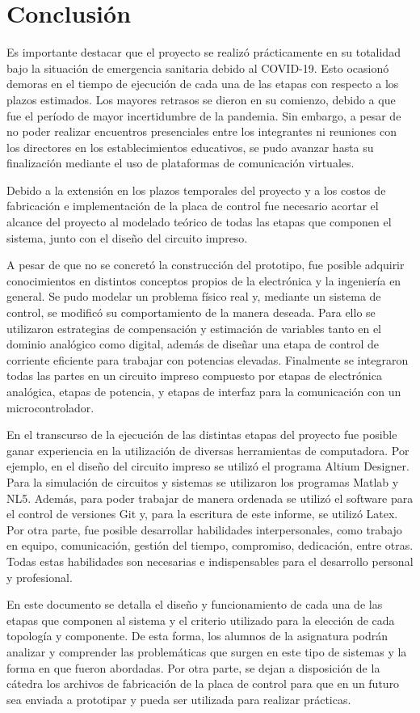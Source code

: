 \chapter{Conclusión}  \label{cap:Conclusión}
Es importante destacar que el proyecto se realizó prácticamente en su totalidad bajo la situación de emergencia sanitaria debido al COVID-19. Esto ocasionó demoras en el tiempo de ejecución de cada una de las etapas con respecto a los plazos estimados. Los mayores retrasos se dieron en su comienzo, debido a que fue el período de mayor incertidumbre de la pandemia. Sin embargo, a pesar de no poder realizar encuentros presenciales entre los integrantes ni reuniones con los directores en los establecimientos educativos, se pudo avanzar hasta su finalización  mediante el uso de plataformas de comunicación virtuales.

Debido a la extensión en los plazos temporales del proyecto y a los costos de fabricación e implementación de la placa de control fue necesario acortar el alcance del proyecto al modelado teórico de todas las etapas que componen el sistema, junto con el diseño del circuito impreso.

A pesar de que no se concretó la construcción del prototipo, fue posible adquirir conocimientos en distintos conceptos propios de la electrónica y la ingeniería en general. Se pudo modelar un problema físico real y, mediante un sistema de control, se modificó su comportamiento de la manera deseada. Para ello se utilizaron estrategias de compensación y estimación de variables tanto en el dominio analógico como digital, además de diseñar una etapa de control de corriente eficiente para trabajar con potencias elevadas. Finalmente se integraron todas las partes en un circuito impreso compuesto por etapas de electrónica analógica, etapas de potencia, y etapas de interfaz para la comunicación con un microcontrolador.

En el transcurso de la ejecución de las distintas etapas del proyecto fue posible ganar experiencia en la utilización de diversas herramientas de computadora. Por ejemplo, en el diseño del circuito impreso se utilizó el programa Altium Designer. Para la simulación de circuitos y sistemas se utilizaron los programas Matlab y NL5. Además, para poder trabajar de manera ordenada se utilizó el software para el control de versiones Git y, para la escritura de este informe, se utilizó Latex. Por otra parte, fue posible desarrollar habilidades interpersonales, como trabajo en equipo, comunicación, gestión del tiempo, compromiso, dedicación, entre otras. Todas estas habilidades son necesarias e indispensables para el desarrollo personal y profesional.


En este documento se detalla el diseño y funcionamiento de cada una de las etapas que componen al sistema y el criterio utilizado para la elección de cada topología y componente. De esta forma, los alumnos de la asignatura podrán analizar y comprender las problemáticas que surgen en este tipo de sistemas y la forma en que fueron abordadas. Por otra parte, se dejan a disposición de la cátedra  los archivos de fabricación de la placa de control para que en un futuro sea enviada  a prototipar y pueda ser utilizada para realizar prácticas.
